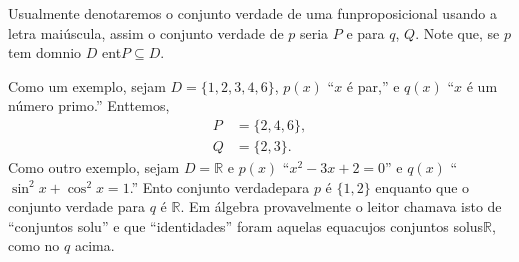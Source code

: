 Usualmente denotaremos o conjunto verdade de uma fun\cao proposicional usando a letra mai\'uscula, assim o conjunto verdade de $p$ seria $P$ e para $q$, $Q$. Note que, se $p$ tem dom\ih nio $D$ ent\ao $P\subseteq D$.

Como um exemplo, sejam $D=\{1,2,3,4,6\}$, $p(x)$ ``$x$ \'e par,'' e $q(x)$ ``$x$ \'e um n\'umero primo.'' Ent\ao temos, 
\begin{equation*}
 \begin{aligned}
P&=\{2,4,6\},\\
Q&=\{2,3\}.
 \end{aligned}
\end{equation*}
Como outro exemplo, sejam $D=\mathbb{R}$ e $p(x)$ ``$x^2-3x+2=0$'' e $q(x)$ ``$\sin^2x+\cos^2x=1$.'' Ent\ao o conjunto verdadepara $p$ \'e $\{1,2\}$ enquanto que o conjunto verdade para $q$ \'e $\mathbb{R}$. Em \'algebra provavelmente o leitor chamava isto de ``conjuntos solu\caoi'' e que ``identidades'' foram aquelas equa\coes cujos conjuntos solu\coes s\ao $\mathbb{R}$, como no $q$ acima.

